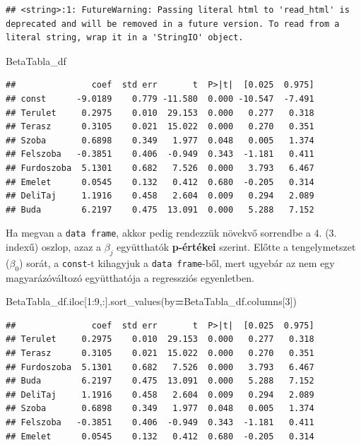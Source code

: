 \documentclass[
]{book}
\newenvironment{Shaded}{\begin{snugshade}}{\end{snugshade}}
\newcommand{\DecValTok}[1]{\textcolor[rgb]{0.00,0.00,0.81}{#1}}
\newcommand{\NormalTok}[1]{#1}
\newcommand{\OperatorTok}[1]{\textcolor[rgb]{0.81,0.36,0.00}{\textbf{#1}}}
\begin{document}
\begin{verbatim}
## <string>:1: FutureWarning: Passing literal html to 'read_html' is deprecated and will be removed in a future version. To read from a literal string, wrap it in a 'StringIO' object.
\end{verbatim}

\begin{Shaded}
\begin{Highlighting}[]
\NormalTok{BetaTabla\_df}
\end{Highlighting}
\end{Shaded}

\begin{verbatim}
##               coef  std err       t  P>|t|  [0.025  0.975]
## const      -9.0189    0.779 -11.580  0.000 -10.547  -7.491
## Terulet     0.2975    0.010  29.153  0.000   0.277   0.318
## Terasz      0.3105    0.021  15.022  0.000   0.270   0.351
## Szoba       0.6898    0.349   1.977  0.048   0.005   1.374
## Felszoba   -0.3851    0.406  -0.949  0.343  -1.181   0.411
## Furdoszoba  5.1301    0.682   7.526  0.000   3.793   6.467
## Emelet      0.0545    0.132   0.412  0.680  -0.205   0.314
## DeliTaj     1.1916    0.458   2.604  0.009   0.294   2.089
## Buda        6.2197    0.475  13.091  0.000   5.288   7.152
\end{verbatim}

Ha megvan a \texttt{data\ frame}, akkor pedig rendezzük növekvő sorrendbe a 4. (3. indexű) oszlop, azaz a \(\beta_j\) együtthatók \textbf{p-értékei} szerint. Előtte a tengelymetszet (\(\beta_0\)) sorát, a \texttt{const}-t kihagyjuk a \texttt{data\ frame}-ből, mert ugyebár az nem egy magyarázóváltozó együtthatója a regressziós egyenletben.

\begin{Shaded}
\begin{Highlighting}[]
\NormalTok{BetaTabla\_df.iloc[}\DecValTok{1}\NormalTok{:}\DecValTok{9}\NormalTok{,:].sort\_values(by}\OperatorTok{=}\NormalTok{BetaTabla\_df.columns[}\DecValTok{3}\NormalTok{])}
\end{Highlighting}
\end{Shaded}

\begin{verbatim}
##               coef  std err       t  P>|t|  [0.025  0.975]
## Terulet     0.2975    0.010  29.153  0.000   0.277   0.318
## Terasz      0.3105    0.021  15.022  0.000   0.270   0.351
## Furdoszoba  5.1301    0.682   7.526  0.000   3.793   6.467
## Buda        6.2197    0.475  13.091  0.000   5.288   7.152
## DeliTaj     1.1916    0.458   2.604  0.009   0.294   2.089
## Szoba       0.6898    0.349   1.977  0.048   0.005   1.374
## Felszoba   -0.3851    0.406  -0.949  0.343  -1.181   0.411
## Emelet      0.0545    0.132   0.412  0.680  -0.205   0.314
\end{verbatim}
\end{document}
